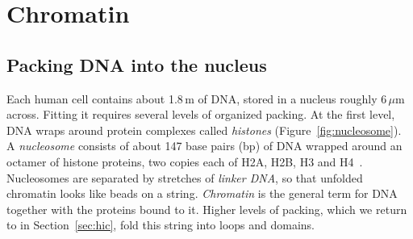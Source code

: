 \section{Chromatin}
\label{sec:chromatin}

\subsection{Packing DNA into the nucleus}

Each human cell contains about 1.8\,m of DNA, stored in a nucleus roughly 6\,$\mu$m across. Fitting it requires several levels of organized packing. At the first level, DNA wraps around protein complexes called \emph{histones} (Figure~\ref{fig:nucleosome}). A \emph{nucleosome} consists of about 147 base pairs (bp) of DNA wrapped around an octamer of histone proteins, two copies each of H2A, H2B, H3 and H4~\citep{luger1997}. Nucleosomes are separated by stretches of \emph{linker DNA}, so that unfolded chromatin looks like beads on a string. \emph{Chromatin} is the general term for DNA together with the proteins bound to it. Higher levels of packing, which we return to in Section~\ref{sec:hic}, fold this string into loops and domains.

